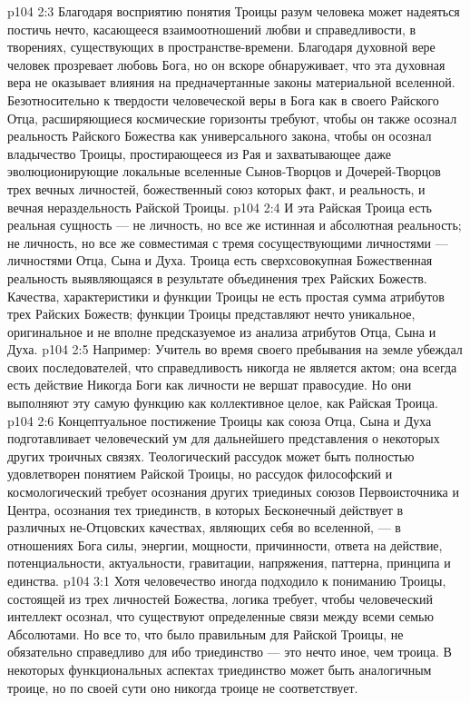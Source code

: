 \vs p104 2:3 Благодаря восприятию понятия Троицы разум человека может надеяться постичь нечто, касающееся взаимоотношений любви и справедливости, в творениях, существующих в пространстве\hyp{}времени. Благодаря духовной вере человек прозревает любовь Бога, но он вскоре обнаруживает, что эта духовная вера не оказывает влияния на предначертанные законы материальной вселенной. Безотносительно к твердости человеческой веры в Бога как в своего Райского Отца, расширяющиеся космические горизонты требуют, чтобы он также осознал реальность Райского Божества как универсального закона, чтобы он осознал владычество Троицы, простирающееся из Рая и захватывающее даже эволюционирующие локальные вселенные Сынов\hyp{}Творцов и Дочерей\hyp{}Творцов трех вечных личностей, божественный союз которых  факт, и реальность, и вечная нераздельность Райской Троицы.
\vs p104 2:4 И эта Райская Троица есть реальная сущность --- не личность, но все же истинная и абсолютная реальность; не личность, но все же совместимая с тремя сосуществующими личностями --- личностями Отца, Сына и Духа. Троица есть сверхсовокупная Божественная реальность выявляющаяся в результате объединения трех Райских Божеств. Качества, характеристики и функции Троицы не есть простая сумма атрибутов трех Райских Божеств; функции Троицы представляют нечто уникальное, оригинальное и не вполне предсказуемое из анализа атрибутов Отца, Сына и Духа.
\vs p104 2:5 Например: Учитель во время своего пребывания на земле убеждал своих последователей, что справедливость никогда не является  актом; она всегда есть действие  Никогда Боги как личности не вершат правосудие. Но они выполняют эту самую функцию как коллективное целое, как Райская Троица.
\vs p104 2:6 Концептуальное постижение Троицы как союза Отца, Сына и Духа подготавливает человеческий ум для дальнейшего представления о некоторых других троичных связях. Теологический рассудок может быть полностью удовлетворен понятием Райской Троицы, но рассудок философский и космологический требует осознания других триединых союзов Первоисточника и Центра, осознания тех триединств, в которых Бесконечный действует в различных не\hyp{}Отцовских качествах, являющих себя во вселенной, --- в отношениях Бога силы, энергии, мощности, причинности, ответа на действие, потенциальности, актуальности, гравитации, напряжения, паттерна, принципа и единства.
\vs p104 3:1 Хотя человечество иногда подходило к пониманию Троицы, состоящей из трех личностей Божества, логика требует, чтобы человеческий интеллект осознал, что существуют определенные связи между всеми семью Абсолютами. Но все то, что было правильным для Райской Троицы, не обязательно справедливо для  ибо триединство --- это нечто иное, чем троица. В некоторых функциональных аспектах триединство может быть аналогичным троице, но по своей сути оно никогда троице не соответствует.

